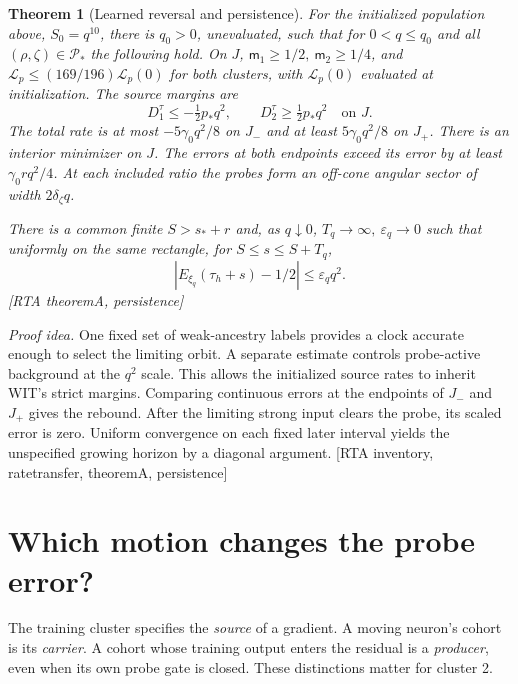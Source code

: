 \documentclass[10pt,twocolumn]{article}
\newtheorem{theorem}{Theorem}
\newcommand{\idea}{\par\noindent\emph{Proof idea.} }
\newcommand{\src}[1]{\textnormal{\small [#1]}}
\begin{document}
\begin{theorem}[Learned reversal and persistence]\label{p1thv1:reversal}
For the initialized population above, \(S_0=q^{10}\), there is
\(q_0>0\), unevaluated, such that for \(0<q\le q_0\) and all
\((\rho,\zeta)\in\mathcal P_*\) the following hold.
On \(J\), \(\mathsf m_1\ge1/2,\ \mathsf m_2\ge1/4\), and
\(\mathcal L_p\le(169/196)\mathcal L_p(0)\) for both clusters, with \(\mathcal L_p(0)\) evaluated at initialization.
The source margins are
\[
 D_1^\tau\le-\tfrac12p_*q^2,\qquad
 D_2^\tau\ge \tfrac12p_*q^2 \quad\text{on }J .
\]
The total rate is at most \(-5\gamma_0q^2/8\) on \(J_-\) and at
least \(5\gamma_0q^2/8\) on \(J_+\). There is an interior minimizer
on \(J\). The errors at \emph{both} endpoints exceed its error by
at least \(\gamma_0rq^2/4\). At each included ratio the probes form an
off-cone angular sector of width \(2\delta_\zeta q\).

There is a common finite \(S>s_*+r\) and, as \(q\downarrow0\),
\(T_q\to\infty,\ \varepsilon_q\to0\) such that uniformly on the
same rectangle, for \(S\le s\le S+T_q\),
\[
 |E_{\xi_q}(\tau_h+s)-1/2|\le\varepsilon_q q^2 .
\]
\src{RTA theoremA, persistence}
\end{theorem}
\idea One fixed set of weak-ancestry labels provides a clock accurate
enough to select the limiting orbit. A separate estimate controls
probe-active background at the \(q^2\) scale. This allows the initialized
source rates to inherit WIT's strict margins. Comparing continuous
errors at the endpoints of \(J_-\) and \(J_+\) gives the rebound.
After the limiting strong input clears the probe, its scaled error is
zero. Uniform convergence on each fixed later interval yields the
unspecified growing horizon by a diagonal argument.
\src{RTA inventory, ratetransfer, theoremA, persistence}

\section{Which motion changes the probe error?}\label{p1thv1:mechanism}
The training cluster specifies the \emph{source} of a gradient.
A moving neuron's cohort is its \emph{carrier}. A cohort whose training
output enters the residual is a \emph{producer}, even when its own
probe gate is closed. These distinctions matter for cluster 2.
\end{document}
